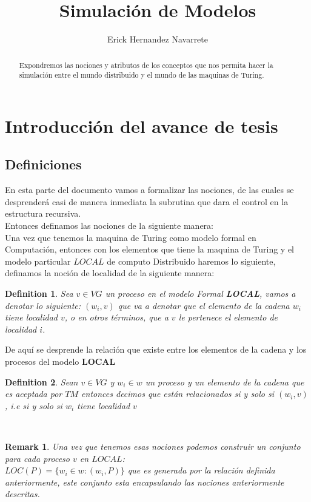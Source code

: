 \documentclass[10pt]{article}
\author{Erick Hernandez Navarrete}
\title{Simulación de Modelos}
\newtheorem*{remark}{Remark}
\newtheorem{definition}{Definition}
\begin{document}
    \maketitle
    \tableofcontents
    \section{Introducción del avance de tesis}\label{sec:introducción-del-avance-de-tesis}     %

    \begin{abstract}
        Expondremos las nociones y atributos de los conceptos que nos permita
        hacer la simulación entre el mundo distribuido y el mundo de las maquinas
        de Turing.
    \end{abstract}
    \space
    \subsection{Definiciones}\label{subsec:definiciones}
    En esta parte del documento vamos a formalizar las nociones, de las cuales se desprenderá casi de manera
    inmediata la subrutina que dara el control en la estructura recursiva.\\
    Entonces definamos las nociones de la siguiente manera:
    \\
    Una vez que tenemos la maquina de Turing como modelo formal en Computación, entonces con los elementos que tiene la
    maquina de Turing y el modelo particular $LOCAL$ de computo Distribuido haremos lo siguiente, definamos la noción de localidad de la siguiente manera:

    \theoremstyle{definition}
    \begin{definition}
        Sea $v \in VG$ un proceso en el modelo Formal \textbf{LOCAL}, vamos a denotar lo siguiente:
        $(w_{i},v)$ que va a denotar que el elemento de la cadena $w_{i}$ tiene localidad $v$,
        o en otros términos, que a $v$ le pertenece el elemento de localidad $i$.
    \end{definition}
    De aquí se desprende la relación que existe entre los elementos de la cadena y los procesos
    del modelo $\textbf{LOCAL}$

    \theoremstyle{definition}
    \begin{definition}
        Sean $v \in VG$ y $w_{i} \in w$ un proceso y un elemento de la cadena que es aceptada por $TM$
        entonces decimos que están relacionados si y solo si $(w_{i},v)$, i.e si y solo si $w_{i}$ tiene localidad $v$
    \end{definition}
    \\
    \begin{remark}
        Una vez que tenemos esas nociones podemos construir un conjunto para cada proceso $v$ en $LOCAL$:\\
        $LOC(P) = \{w_{i} \in w :   (w_{i},P)\}$  que es generada por la relación definida anteriormente,
        este conjunto esta encapsulando las nociones anteriormente descritas.
    \end{remark}
\end{document}
